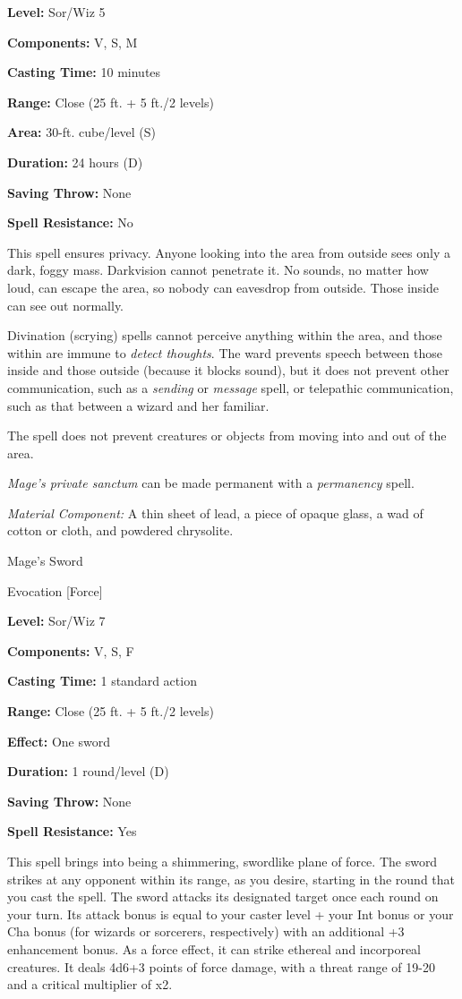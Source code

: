 \documentclass{article}
\begin{document}
\textbf{Level:} Sor/Wiz 5

\textbf{Components:} V, S, M

\textbf{Casting Time:} 10 minutes

\textbf{Range:} Close (25 ft. + 5 ft./2 levels)

\textbf{Area:} 30-ft. cube/level (S)

\textbf{Duration:} 24 hours (D)

\textbf{Saving Throw:} None

\textbf{Spell Resistance:} No

This spell ensures privacy. Anyone looking into the area from outside sees only 
a dark, foggy mass. Darkvision cannot penetrate it. No sounds, no matter how loud, 
can escape the area, so nobody can eavesdrop from outside. Those inside can see 
out normally.

Divination (scrying) spells cannot perceive anything within the area, and those 
within are immune to \textit{detect thoughts}. The ward prevents speech between 
those inside and those outside (because it blocks sound), but it does not prevent 
other communication, such as a \textit{sending }or \textit{message }spell, or telepathic 
communication, such as that between a wizard and her familiar.

The spell does not prevent creatures or objects from moving into and out of the 
area.

\textit{Mage's private sanctum }can be made permanent with a \textit{permanency 
}spell.

\textit{Material Component: }A thin sheet of lead, a piece of opaque glass, a wad 
of cotton or cloth, and powdered chrysolite.

\vspace{12pt}
Mage's Sword

Evocation [Force]

\textbf{Level:} Sor/Wiz 7

\textbf{Components:} V, S, F

\textbf{Casting Time:} 1 standard action

\textbf{Range:} Close (25 ft. + 5 ft./2 levels)

\textbf{Effect:} One sword

\textbf{Duration:} 1 round/level (D)

\textbf{Saving Throw:} None

\textbf{Spell Resistance:} Yes

This spell brings into being a shimmering, swordlike plane of force. The sword 
strikes at any opponent within its range, as you desire, starting in the round 
that you cast the spell. The sword attacks its designated target once each round 
on your turn. Its attack bonus is equal to your caster level + your Int bonus or 
your Cha bonus (for wizards or sorcerers, respectively) with an additional +3 enhancement 
bonus. As a force effect, it can strike ethereal and incorporeal creatures. It 
deals 4d6+3 points of force damage, with a threat range of 19-20 and a critical 
multiplier of x2.
\end{document}
